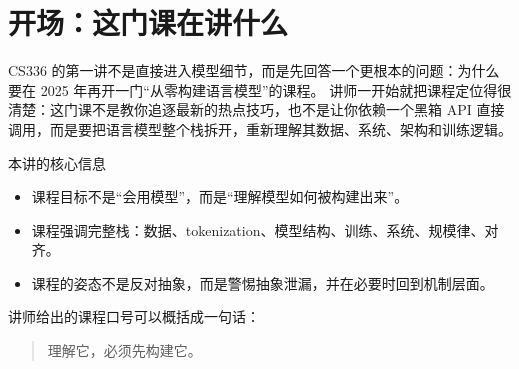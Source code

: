 \section{开场：这门课在讲什么}

CS336 的第一讲不是直接进入模型细节，而是先回答一个更根本的问题：为什么要在 2025 年再开一门“从零构建语言模型”的课程。
讲师一开始就把课程定位得很清楚：这门课不是教你追逐最新的热点技巧，也不是让你依赖一个黑箱 API 直接调用，而是要把语言模型整个栈拆开，重新理解其数据、系统、架构和训练逻辑。

\begin{importantbox}{本讲的核心信息}
\begin{itemize}
    \item 课程目标不是“会用模型”，而是“理解模型如何被构建出来”。
    \item 课程强调完整栈：数据、tokenization、模型结构、训练、系统、规模律、对齐。
    \item 课程的姿态不是反对抽象，而是警惕抽象泄漏，并在必要时回到机制层面。
\end{itemize}
\end{importantbox}

讲师给出的课程口号可以概括成一句话：
\begin{quote}
理解它，必须先构建它。
\end{quote}

